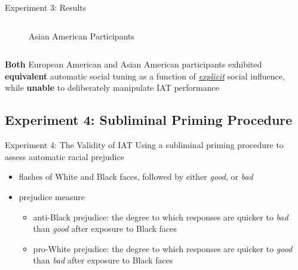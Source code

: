 \begin{frame}{Experiment 3: Results}
\begin{columns}
\begin{column}{0.45\textwidth}
\begin{figure}
                    {\footnotesize Asian American Participants}
                \end{figure}
            \end{column}
        \end{columns}
        \vspace*{10pt}
        {\small \textcolor{lightlavender!55!white}{\textbf{Both}} European American and Asian American participants exhibited \textcolor{lightlavender!55!white}{\textbf{equivalent}} automatic social tuning as a function of \textit{\underline{explicit}}} social influence, while \textcolor{lightlavender!55!white}{\textbf{unable}} to deliberately manipulate IAT performance
    \end{frame}

    \subsection{Experiment 4: Subliminal Priming Procedure}
    \begin{frame}{Experiment 4: The Validity of IAT}
        Using a subliminal priming procedure to assess automatic racial prejudice {\footnotesize \citep{bargh1996automaticity,chen1997nonconscious,lepore1997category,wittenbrink2001spontaneous}}
        \begin{itemize}
            \item flashes of White and Black faces, followed by either \textit{good}, or \textit{bad}
            \item prejudice measure
            \begin{itemize}
                \item anti-Black prejudice: the degree to which responses are quicker to \textit{bad} than \textit{good} after exposure to Black faces
                \item pro-White prejudice: the degree to which responses are quicker to \textit{good} than \textit{bad} after exposure to Black faces
            \end{itemize}
        \end{itemize}
    \end{frame}
    
